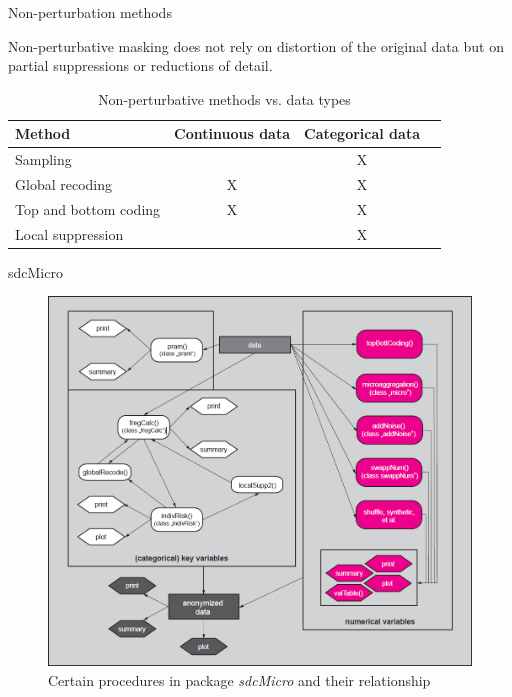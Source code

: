 \documentclass[
	aspectratio = 169
 ]{beamer}
\begin{document}
\begin{frame}{Non-perturbation methods}

Non-perturbative masking does not rely on distortion of the original
data but on partial suppressions or reductions of detail.

\begin{table}[ht]   
\centering  
\begin{tabular}[t]{lccc}    
\toprule    
 Method & Continuous data & Categorical data&\\ 
\midrule    
 Sampling  & & X &\\    
 Global recoding & X & X &\\    
 Top and bottom coding& X & X &\\   
 Local suppression & & X &\\    
\bottomrule 
\end{tabular}   
\caption{Non-perturbative methods vs. data types}   
\end{table}

\end{frame}
\begin{frame}{sdcMicro}

\begin{figure}
    \centering
    \includegraphics[width=0.5\linewidth
                    ]{Presentation//gallery/sdcMicro.png}
    \caption{Certain procedures in package \emph{sdcMicro} and their
relationship}
\end{figure}

\end{frame}
\end{document}
